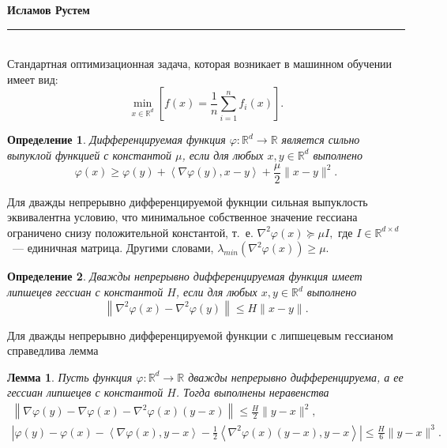 \documentclass[a4paper, 12pt]{article}
\newcommand{\R}{\mathbb{R}}
\newtheorem{def1}{Определение}
\newtheorem{lem1}{Лемма}
\begin{document}
	\hfill\textbf{Исламов Рустем}
	\rule{7in}{1.8pt}\\
	
	\noindent Стандартная оптимизационная задача, которая возникает в машинном обучении имеет вид:
	\begin{equation}
		\min\limits_{x\in\R^d}\left[f(x) = \frac{1}{n}\sum\limits_{i=1}^n f_i(x)\right].
	\end{equation}

	\begin{def1}
		Дифференцируемая функция $\varphi:\R^d\rightarrow \R$ является сильно выпуклой функцией с константой $\mu$, если для любых $x, y\in \R^d$ выполнено
		\begin{equation}
		    \varphi(x) \geq \varphi(y) + \left<\nabla \varphi(y), x-y\right> +\frac{\mu}{2}\|x-y\|^2.
		\end{equation}
	\end{def1}
	\noindent Для дважды непрерывно дифференцируемой фукнции сильная выпуклость эквивалентна условию, что минимальное собственное значение гессиана ограничено снизу положительной константой, т.~е. $\nabla^2\varphi(x) \succeq \mu I,$ где $I \in \R^{d\times d}$~--- единичная матрица. Другими словами, $\lambda_{min}(\nabla^2\varphi(x)) \geq \mu.$
	
	\begin{def1}
		Дважды непрерывно дифференцируемая функция имеет липшецев гессиан с константой $H$, если для любых $x,y \in \R^d$ выполнено
	\begin{equation}
		\left\|\nabla^2 \varphi(x) - \nabla^2\varphi(y)\right\| \leq H\|x-y\|.
	\end{equation}
	\end{def1}
	\noindent Для дважды непрерывно дифференцируемой функции с липшецевым гессианом справедлива лемма
	\begin{lem1}
		Пусть функция $\varphi:\R^d \rightarrow \R$ дважды непрерывно дифференцируема, а ее гессиан липшецев с константой $H$. Тогда выполнены неравенства
		\begin{eqnarray}\label{lem1}
			\left\|\nabla \varphi(y) - \nabla\varphi(x) - \nabla^2 \varphi(x)(y-x)\right\|  \leq \frac{H}{2}\|y-x\|^2,\\
			\left|\varphi(y)-\varphi(x)-\left<\nabla \varphi(x),y-x\right> -\frac{1}{2}\left<\nabla^2\varphi(x)(y-x), y-x\right>\right| \leq \frac{H}{6}\|y-x\|^3.
		\end{eqnarray}
	\end{lem1}
	
\end{document}
